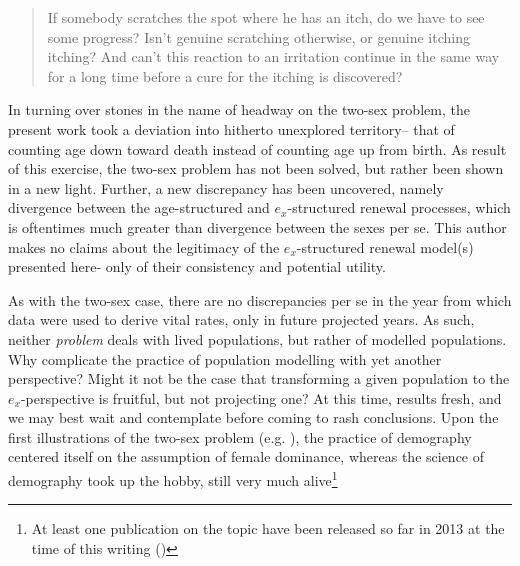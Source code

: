 
\begin{singlespace}
\begin{quote}
 If somebody scratches the spot where he has an itch, do we have to see 
 some progress? Isn't genuine scratching otherwise, or genuine itching 
itching? And can't this reaction to an irritation continue in the 
same way for a long time before a cure for the itching is discovered?
\citep{wittgenstein1984culture}
\end{quote}
\end{singlespace}

In turning over stones in the name of headway on the two-sex problem, the
present work took a deviation into hitherto unexplored territory-- that of
counting age down toward death instead of counting age up from birth. As result of this exercise,
the two-sex problem has not been solved, but rather been shown in a new light.
Further, a new discrepancy has been uncovered, namely divergence between the
age-structured and $e_x$-structured renewal processes, which is oftentimes much greater than
divergence between the sexes per se. This author makes no claims about the
legitimacy of the $e_x$-structured renewal model(s) presented here- only of
their consistency and potential utility. 

As with the two-sex case, there are no
discrepancies per se in the year from which data were used to derive vital
rates, only in future projected years. As such, neither \textit{problem} deals with lived populations, but rather of
modelled populations. Why complicate the practice of population modelling with yet
another perspective? Might it not be the case that transforming a given
population to the $e_x$-perspective is fruitful, but not projecting one? At this
time, results fresh, and we may best wait and contemplate before coming to rash
conclusions. Upon the first illustrations of the two-sex problem (e.g.
\cite{kuczynski1932fertility}), the practice of demography centered itself on
the assumption of female dominance, whereas the science of demography took up
the hobby, still very much alive\footnote{At least one publication on the
topic have been released so far in 2013 at the time of this writing (\citet{Matthews2013})}



